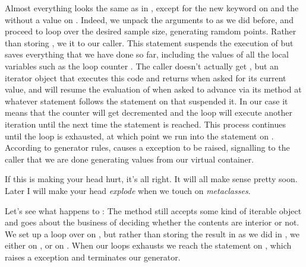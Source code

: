 Almost everything looks the same as in , except for the new
keyword  on  and the  without a
value on . Indeed, we unpack the arguments to 
as we did before, and proceed to loop over the desired sample size, generating ramdom points.
Rather than storing , we  it to our caller. This statement
suspends the execution of  but saves everything that we have done so far,
including the values of all the local variables such as the loop counter . The
caller doesn't actually get , but an iterator object that executes this code and
returns  when asked for its current value, and will resume the evaluation of
 when asked to advance via its  method at whatever statement
follows the  statement on  that suspended it. In
our case it means that the counter will get decremented and the loop will execute another
iteration until the next time the  statement is reached. This process continues
until the loop is exhausted, at which point we run into the  statement on
. According to generator rules,  causes a
 exception to be raised, signalling to the caller that we are done
generating values from our virtual container.

If this is making your head hurt, it's all right. It will all make sense pretty soon. Later I
will make your head {\em explode} when we touch on {\em metaclasses}.

Let's see what happens to :
%
%
The method  still accepts some kind of iterable object  and
goes about the business of deciding whether the contents are interior or not. We set up a loop
over  on , but rather than storing the
result in  as we did in , we either
  on , or  on
. When our loops exhausts  we reach the
 statement on , which raises a
 exception and terminates our generator.


